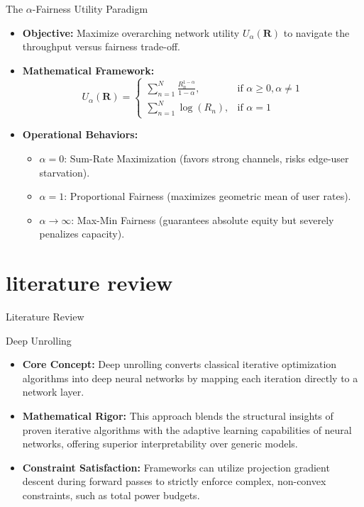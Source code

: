 \documentclass[aspectratio=169]{beamer}
\begin{document}
\begin{frame}{The $\alpha$-Fairness Utility Paradigm}
    \begin{itemize}
        \item \textbf{Objective:} Maximize overarching network utility $U_\alpha(\mathbf{R})$ to navigate the throughput versus fairness trade-off.
        \item \textbf{Mathematical Framework:}
        $$U_\alpha(\mathbf{R}) = \begin{cases} \sum_{n=1}^N \frac{R_n^{1-\alpha}}{1-\alpha}, & \text{if } \alpha \ge 0, \alpha \neq 1 \\ \sum_{n=1}^N \log(R_n), & \text{if } \alpha = 1 \end{cases}$$
        \item \textbf{Operational Behaviors:}
        \begin{itemize}
            \item $\alpha=0$: Sum-Rate Maximization (favors strong channels, risks edge-user starvation).
            \item $\alpha=1$: Proportional Fairness (maximizes geometric mean of user rates).
            \item $\alpha\to\infty$: Max-Min Fairness (guarantees absolute equity but severely penalizes capacity).
        \end{itemize}
    \end{itemize}
\end{frame}

\section{literature review}

\begin{frame}
    \huge
    \centering
    Literature Review
\end{frame}

\begin{frame}{Deep Unrolling}
    \begin{itemize}
        \item \textbf{Core Concept:} Deep unrolling converts classical iterative optimization algorithms into deep neural networks by mapping each iteration directly to a network layer.\cite{He2022}
        \item \textbf{Mathematical Rigor:} This approach blends the structural insights of proven iterative algorithms with the adaptive learning capabilities of neural networks, offering superior interpretability over generic models.
        \item \textbf{Constraint Satisfaction:} Frameworks can utilize projection gradient descent during forward passes to strictly enforce complex, non-convex constraints, such as total power budgets.
    \end{itemize}
\end{frame}
\end{document}
